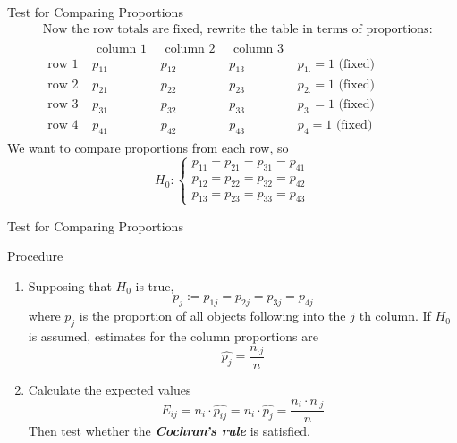\documentclass{beamer}
\newcommand{\bb}[1]{\textcolor{antiquefuchsia}{\textbf{\textit{#1}}}}
\begin{document}
\begin{frame}{Test for Comparing Proportions}
$$
\begin{aligned}
&\text { Now the row totals are fixed, rewrite the table in terms of proportions: }\\
&\begin{array}{l|ccc|l} 
& \text { column 1 } & \text { column 2 } & \text { column 3 } & \\
\hline \text { row 1 } & p_{11} & p_{12} & p_{13} & p_{1 .}=1 \text { (fixed) } \\
\text { row 2 } & p_{21} & p_{22} & p_{23} & p_{2 .}=1 \text { (fixed) } \\
\text { row 3 } & p_{31} & p_{32} & p_{33} & p_{3 .}=1 \text { (fixed) } \\
\text { row 4 } & p_{41} & p_{42} & p_{43} & p_{4}=1 \text { (fixed) }
\end{array}
\end{aligned}
$$
We want to compare proportions from each row, so
$$
H_{0}:\left\{\begin{array}{l}
p_{11}=p_{21}=p_{31}=p_{41} \\
p_{12}=p_{22}=p_{32}=p_{42} \\
p_{13}=p_{23}=p_{33}=p_{43}
\end{array}\right.
$$
\end{frame}



\begin{frame}{Test for Comparing Proportions}
\begin{block}{Procedure}
\begin{enumerate}

\item Supposing that $H_{0}$ is true,
$$
p_{j}:=p_{1 j}=p_{2 j}=p_{3 j}=p_{4 j}
$$
where $p_{j}$ is the proportion of all objects following into the $j$ th column. If $H_{0}$ is assumed, estimates for the column proportions are
$$
\widehat{p_{j}}=\frac{n_{\cdot j}}{n}
$$
\item Calculate the expected values
$$
E_{i j}=n_{i} \cdot \widehat{p_{i j}}=n_{i} \cdot \widehat{p_{j}}=\frac{n_{i} \cdot n_{\cdot j}}{n}
$$
Then test whether the \bb{Cochran's rule} is satisfied.
\end{enumerate}
\end{block}
\end{frame}
\end{document}
